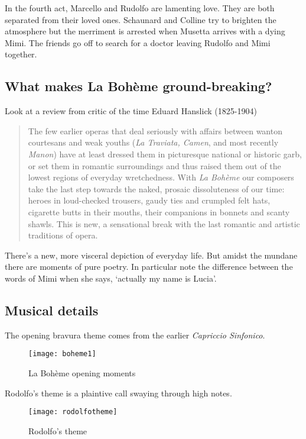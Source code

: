 In the fourth act, Marcello and Rudolfo are lamenting love. They are both separated from their loved ones. Schaunard and Colline try to brighten the atmosphere but the merriment is arrested when Musetta arrives with a dying Mimi. The friends go off to search for a doctor leaving Rudolfo and Mimi together. 

\subsection{What makes La Boh\`eme ground-breaking?}
Look at a review from critic of the time Eduard Hanslick (1825-1904)
\begin{quotation}
The few earlier operas that deal seriously with affairs between wanton courtesans and weak youths (\textit{La Traviata, Camen}, and most recently \textit{Manon}) have at least dressed them in picturesque national or historic garb, or set them in romantic surroundings and thus raised them out of the lowest regions of everyday wretchedness. With \textit{La Boh\`eme} our composers take the last step towards the naked, prosaic dissoluteness of our time: heroes in loud-checked trousers, gaudy ties and crumpled felt hats, cigarette butts in their mouths, their companions in bonnets and scanty shawls. This is new, a sensational break with the last romantic and artistic traditions of opera.
\end{quotation}

There's a new, more visceral depiction of everyday life. But amidst the mundane there are moments of pure poetry. In particular note the difference between the words of Mimi when she says, `actually my name is Lucia'. 

\subsection{Musical details}

The opening bravura theme comes from the earlier \textit{Capriccio Sinfonico}. 

\begin{figure}[H]
\centering
\texttt{[image: boheme1]}\caption{La Boh\`eme opening moments}
\label{fig:boheme1}
\end{figure}

Rodolfo's theme is a plaintive call swaying through high notes.

\begin{figure}[H]
\centering
\texttt{[image: rodolfotheme]}\caption{Rodolfo's theme}
\label{fig:rodolfotheme}
\end{figure}
 
